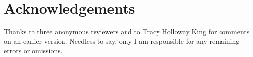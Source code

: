 \documentclass[output=paper,hidelinks]{langscibook}
\begin{document}





\section*{Acknowledgements}
Thanks to three anonymous reviewers and to Tracy Holloway King for comments on an earlier version. Needless to say, only I am responsible for any remaining errors or omissions. 

\sloppy
\printbibliography[heading=subbibliography,notkeyword=this]
\end{document}
